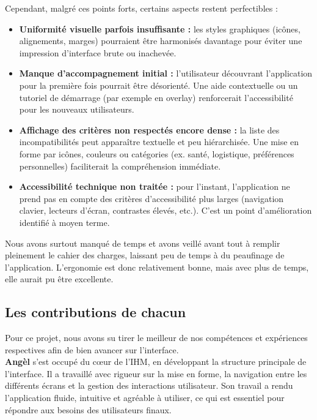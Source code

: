 \documentclass{mytex}
\begin{document}
Cependant, malgré ces points forts, certains aspects restent perfectibles :

\begin{itemize}
	\item \textbf{Uniformité visuelle parfois insuffisante :} les styles graphiques (icônes, alignements, marges) pourraient être harmonisés davantage pour éviter une impression d’interface brute ou inachevée.
	
	\item \textbf{Manque d’accompagnement initial :} l’utilisateur découvrant l’application pour la première fois pourrait être désorienté. Une aide contextuelle ou un tutoriel de démarrage (par exemple en overlay) renforcerait l’accessibilité pour les nouveaux utilisateurs.
	
	\item \textbf{Affichage des critères non respectés encore dense :} la liste des incompatibilités peut apparaître textuelle et peu hiérarchisée. Une mise en forme par icônes, couleurs ou catégories (ex. santé, logistique, préférences personnelles) faciliterait la compréhension immédiate.
	
	\item \textbf{Accessibilité technique non traitée :} pour l’instant, l’application ne prend pas en compte des critères d’accessibilité plus larges (navigation clavier, lecteurs d’écran, contrastes élevés, etc.). C’est un point d’amélioration identifié à moyen terme.
\end{itemize}

Nous avons surtout manqué de temps et avons veillé avant tout à remplir pleinement le cahier des charges, laissant peu de temps à du peaufinage de l'application. L'ergonomie est donc relativement bonne, mais avec plus de temps, elle aurait pu être excellente.

\subsection{Les contributions de chacun}

Pour ce projet, nous avons su tirer le meilleur de nos compétences et expériences respectives afin de bien avancer sur l’interface. \\

\textbf{Angèl} s’est occupé du cœur de l’IHM, en développant la structure principale de l’interface. Il a travaillé avec rigueur sur la mise en forme, la navigation entre les différents écrans et la gestion des interactions utilisateur. Son travail a rendu l’application fluide, intuitive et agréable à utiliser, ce qui est essentiel pour répondre aux besoins des utilisateurs finaux. \\
\end{document}
